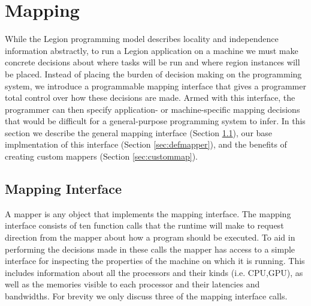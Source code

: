 \section{Mapping}
\label{sec:mapping}

While the Legion programming model describes locality and independence information abstractly,
to run a Legion application on a machine we must make concrete decisions about
where tasks will be run and where region instances will be placed.  Instead of placing
the burden of decision making on the programming system, we introduce a programmable mapping
interface that gives a programmer total control over how these decisions are made.  Armed
with this interface, the programmer can then specify application- or machine-specific
mapping decisions that would be difficult for a general-purpose programming system to infer.
In this section we describe the general mapping interface (Section \ref{sec:mapinterface}),
our base implmentation of this interface (Section \ref{sec:defmapper}), and the benefits
of creating custom mappers (Section \ref{sec:custommap}).

\subsection{Mapping Interface}
\label{sec:mapinterface}
A mapper is any object that implements the mapping interface.  The mapping interface
consists of ten function calls that the runtime will make to request direction from
the mapper about how a program should be executed.  To aid in performing the 
decisions made in these calls the mapper has access to a simple 
interface for inspecting the properties of the machine on which it is running.  This includes 
information about all the processors and their kinds (i.e. CPU,GPU), as well as the memories visible
to each processor and their latencies and bandwidths.  For brevity we only
discuss three of the mapping interface calls.

